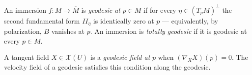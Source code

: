 \begin{definition}
  \label{def:dc-ch6-2-8-geodesic}
  \leanok
  An immersion $f:M\to\overline{M}$ is \emph{geodesic at} $p\in M$ if for every
  $\eta\in(T_pM)^\perp$ the second fundamental form $\mathit{II}_\eta$ is
  identically zero at $p$ — equivalently, by polarization, $B$ vanishes at $p$.
  An immersion is \emph{totally geodesic} if it is geodesic at every
  $p\in M$.
\end{definition}

\begin{definition}
  \label{def:dc-ch6-2-9-geodesic-field}
  \leanok
  A tangent field $X\in\mathcal{X}(U)$ is a \emph{geodesic field at} $p$ when
  $(\nabla_X X)(p)=0$. The velocity field of a geodesic satisfies this condition
  along the geodesic.
\end{definition}

